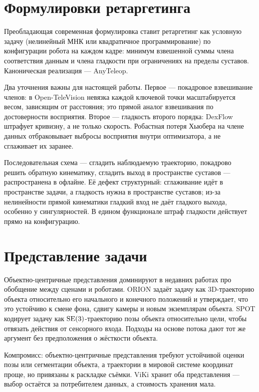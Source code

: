 \documentclass[12pt, a4paper, oneside]{report}
\begin{document}
\section{Формулировки ретаргетинга}

Преобладающая современная формулировка ставит ретаргетинг как условную задачу
(нелинейный МНК или квадратичное программирование) по конфигурации робота на
каждом кадре: минимум взвешенной суммы члена соответствия данным и члена
гладкости при ограничениях на пределы суставов. Каноническая реализация ---
AnyTeleop.

Два уточнения важны для настоящей работы. Первое --- покадровое взвешивание
членов: в Open-TeleVision невязка каждой ключевой точки масштабируется весом,
зависящим от расстояния; это прямой аналог взвешивания по достоверности
восприятия. Второе --- гладкость второго порядка: DexFlow штрафует кривизну, а не
только скорость. Робастная потеря Хьюбера на члене данных отбраковывает выбросы
восприятия внутри оптимизатора, а не сглаживает их заранее.

Последовательная схема --- сгладить наблюдаемую траекторию, покадрово решить
обратную кинематику, сгладить выход в пространстве суставов --- распространена в
офлайне. Её дефект структурный: сглаживание идёт в пространстве задачи, а
гладкость нужна в пространстве суставов; из-за нелинейности прямой кинематики
гладкий вход не даёт гладкого выхода, особенно у сингулярностей. В едином
функционале штраф гладкости действует прямо на конфигурацию.

\section{Представление задачи}

Объектно-центричные представления доминируют в недавних работах про обобщение
между сценами и роботами. ORION задаёт задачу как 3D-траекторию объекта
относительно его начального и конечного положений и утверждает, что это устойчиво
к смене фона, сдвигу камеры и новым экземплярам объекта. SPOT кодирует задачу как
$\mathrm{SE}(3)$-траекторию позы объекта относительно цели, чтобы отвязать действия от
сенсорного входа. Подходы на основе потока дают тот же аргумент без предположения
о жёсткости объекта.

Компромисс: объектно-центричные представления требуют устойчивой оценки позы или
сегментации объекта, а траектории в мировой системе координат проще, но привязаны
к раскладке съёмки. ViKi хранит оба представления --- выбор остаётся за
потребителем данных, а стоимость хранения мала.
\end{document}
